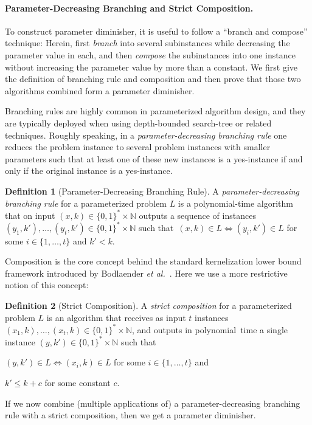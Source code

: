 \documentclass[11pt,a4,USenglish]{article}
\theoremstyle{definition}
\newtheorem{defi}{Definition}
\theoremstyle{plain}
\theoremstyle{remark}
\begin{document}
%
%
%
%

%
\paragraph{Parameter-Decreasing Branching and Strict Composition.}
To construct parameter diminisher, it is useful to follow a ``branch and compose'' technique: Herein, first \emph{branch} into several subinstances while decreasing the parameter value in each, and then \emph{compose} the subinstances into one instance without increasing the parameter value by more than a constant. 
We first give the definition of branching rule and composition and then prove that those two algorithms combined form a parameter diminisher.


%
Branching rules are highly common in parameterized algorithm design, and they are typically deployed when using depth-bounded search-tree or related techniques. Roughly speaking, in a \emph{parameter-decreasing branching rule} one reduces the problem instance to several problem instances with smaller parameters such that at least one of these new instances is a yes-instance if and only if the original instance is a yes-instance. 
\begin{defi}[Parameter-Decreasing Branching Rule]
\label{def:branching}
A \emph{parameter-decreasing branching rule} for a parameterized problem $L$ is a polynomial-time algorithm that on input $(x,k) \in \{0,1\}^* \times \mathbb{N}$ outputs a sequence of instances $(y_1,k'),\ldots,(y_t,k') \in \{0,1\}^* \times \mathbb{N}$ such that~$(x,k) \in L \iff (y_i,k') \in L$ for some $i \in \{1,\ldots,t\}$ and $k' < k$.
\end{defi}
%
Composition is the core concept behind the standard kernelization lower bound framework introduced by Bodlaender \emph{et al.}~\cite{BodlaenderDFH09}. Here we use a more restrictive notion of this concept:

\begin{defi}[Strict Composition]
\label{def:compostion}%
A \emph{strict composition} for a parameterized problem $L$ is an algorithm that receives as input $t$ instances $(x_1,k),\ldots,(x_t,k)\in \{0,1\}^* \times \mathbb{N}$, and outputs in polynomial~time a single instance $(y,k')\in \{0,1\}^* \times \mathbb{N}$ such that
%
%
\begin{inparaenum}[(i)]
\item $(y,k') \in L \iff (x_i,k) \in L$ for some $i \in \{1,\ldots,t\}$ and
\item $k' \leq k + c$ for some constant $c$.
\end{inparaenum}
%
%
\end{defi}
%
If we now combine (multiple applications of) a parameter-decreasing branching rule with a strict composition, then we get a parameter diminisher. 
\end{document}

